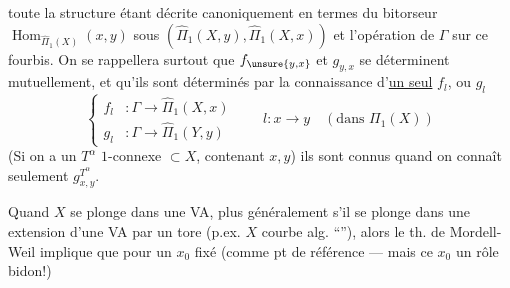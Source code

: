 toute la structure étant décrite canoniquement en termes du bitorseur $\operatorname{Hom}_{\widehat\Pi_1(X)}(x,y)$ sous $(\widehat\Pi_1(X,y),\widehat\Pi_1(X,x))$ et l'opération de $\Gamma$ sur  ce fourbis. On se rappellera surtout que $f_{\unsure{y,x}}$ et $g_{y,x}$ se déterminent mutuellement, et qu'ils sont déterminés par la connaissance d'\uline{un seul}   $f_l$, ou $g_l$
\[
\tag{33}\left\{\begin{aligned}
f_l&:\Gamma\longrightarrow\widehat\Pi_1(X,x)\\
g_l&:\Gamma\longrightarrow\widehat\Pi_1(Y,y)
\end{aligned}\right.
\qquad l:x\longrightarrow y\quad(\text{dans }\Pi_1(X))
\]
(Si on a  un $T^\alpha$ $1$-connexe $\subset X$, contenant $x,y$) ils sont connus quand on connaît seulement $g^{T^\alpha}_{x,y}$.


Quand $X$ se plonge dans une VA, plus généralement s'il se plonge dans une extension d'une VA par un tore (p.ex. $X$ courbe alg. ``''), alors le th. de Mordell-Weil implique que pour un $x_0$  fixé (comme pt de référence --- mais ce $x_0$   un rôle bidon!)
